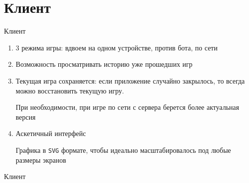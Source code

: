 \documentclass{beamer}
\def\t{\texttt}
\begin{document}
\section{Клиент}

\begin{frame}[t]{Клиент}
    \begin{enumerate}
    \item
        3 режима игры: вдвоем на одном устройстве, против бота, по сети
    \pause
    \item
        Возможность просматривать историю уже прошедших игр
    \pause
    \item
        Текущая игра сохраняется: если приложение случайно закрылось, то всегда можно восстановить текущую игру.

        При необходимости, при игре по сети с сервера берется более актуальная версия
    \pause
    \item
        Аскетичный интерфейс

        Графика в \t{SVG} формате, чтобы идеально масштабировалось под любые размеры экранов
    \end{enumerate}
\end{frame}

\begin{frame}[t]{Клиент}
\end{frame}
\end{document}
